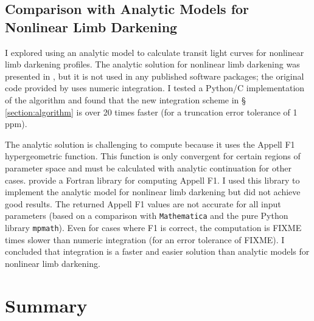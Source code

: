 \documentclass[12pt,preprint]{aastex}
\begin{document}
\subsection{Comparison with Analytic Models for Nonlinear Limb Darkening}
I explored using an analytic model to calculate transit light curves for nonlinear limb darkening profiles.  The analytic solution for nonlinear limb darkening was presented in \cite{mandel02}, but it is not used in any published software packages; the original code provided by \cite{mandel02} uses numeric integration.   I tested a Python/C implementation of the \cite{mandel02} algorithm and found that the new integration scheme in \S\,\ref{section:algorithm} is over 20 times faster (for a truncation error tolerance of 1 ppm).

The analytic solution is challenging to compute because it uses the Appell F1 hypergeometric function.  This function is only convergent for certain regions of parameter space and must be calculated with analytic continuation for other cases. \cite{colavecchia04} provide a Fortran library for computing Appell F1.  I used this library to implement the analytic model for nonlinear limb darkening but did not achieve good results. The returned Appell F1 values are not accurate for all input parameters (based on a comparison with \texttt{Mathematica} and the pure Python library \texttt{mpmath}).  Even for cases where F1 is correct, the computation is FIXME times slower than numeric integration (for an error tolerance of FIXME).  I concluded that integration is a faster and easier solution than analytic models for nonlinear limb darkening.

\section{Summary}

\acknowledgments



\end{document}
